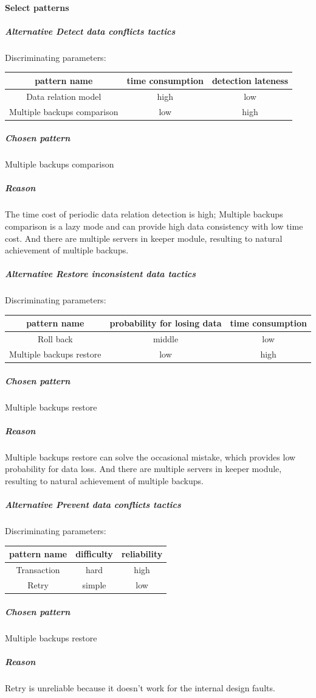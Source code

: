 \documentclass{article}
\begin{document}
		\paragraph{Select patterns}
		\subparagraph{Alternative Detect data conflicts tactics}
		Discriminating parameters:\\
		\begin{center}
			\begin{tabular}{|c|c|c|}
				\hline
				pattern name & time consumption & detection lateness\\
				\hline
				Data relation model& high& low\\
				\hline
				Multiple backups comparison& low& high\\
				\hline
			\end{tabular}
		\end{center}
		\subparagraph{Chosen pattern} 
		Multiple backups comparison
		\subparagraph{Reason} 
		The time cost of periodic data relation detection is high; Multiple backups comparison is a lazy mode and can provide high data consistency with low time cost. And there are multiple servers in keeper module, resulting to natural achievement of multiple backups.

		\subparagraph{Alternative Restore inconsistent data tactics}
		Discriminating parameters:\\
		\begin{center}
			\begin{tabular}{|c|c|c|}
				\hline
				pattern name & probability for losing data & time consumption\\
				\hline
				Roll back& middle & low\\
				\hline
				Multiple backups restore & low& high\\
				\hline
			\end{tabular}
		\end{center}
		\subparagraph{Chosen pattern} 
		Multiple backups restore
		\subparagraph{Reason} 
		Multiple backups restore can solve the occasional mistake, which provides low probability for data loss. And there are multiple servers in keeper module, resulting to natural achievement of multiple backups.

		\subparagraph{Alternative Prevent data conflicts tactics}
		Discriminating parameters:\\
		\begin{center}
			\begin{tabular}{|c|c|c|}
				\hline
				pattern name & difficulty & reliability\\
				\hline
				Transaction & hard & high\\
				\hline
				Retry & simple & low\\
				\hline
			\end{tabular}
		\end{center}
		\subparagraph{Chosen pattern} 
		Multiple backups restore
		\subparagraph{Reason} 
		Retry is unreliable because it doesn't work for the internal design faults.
\end{document}
